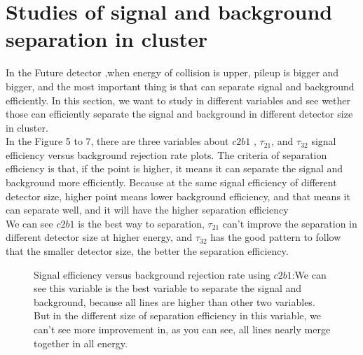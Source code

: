 \section{Studies of signal and background separation in cluster}
In the Future detector ,when energy of collision is upper, pileup is bigger and bigger, and the most important thing is that can separate signal and background efficiently. In this section, we want to study in different variables and see wether those can efficiently separate the signal and background in different detector size in cluster.\\

In the Figure 5 to 7, there are three variables about $c2b1$ , $\tau_{21}$, and $\tau_{32}$ signal efficiency versus background rejection rate plots. The criteria of separation efficiency is that, if the point is higher, it means it can separate the signal and background more efficiently.  Because at the same signal efficiency of different detector size, higher point means lower background efficiency, and that means it can separate well, and it will have the higher separation efficiency\\

We can see  $c2b1$ is the best way to separation, $\tau_{21}$ can't improve the separation in different detector size at higher energy, and $\tau_{32}$ has the good pattern to follow that the smaller detector size, the better the separation efficiency.\\
\label{sec:efficiency}


\begin{figure}
\begin{center}
\end{center}
\caption{Signal efficiency versus background rejection rate using $c2b1$:We can see this variable is the best variable to separate the signal and background, because all lines are higher than other two variables. But in the different size of separation efficiency in this variable, we can't see more improvement in, as you can see, all lines nearly merge together in all energy.}
\label{fig:cluster_c2b1}
\end{figure}


